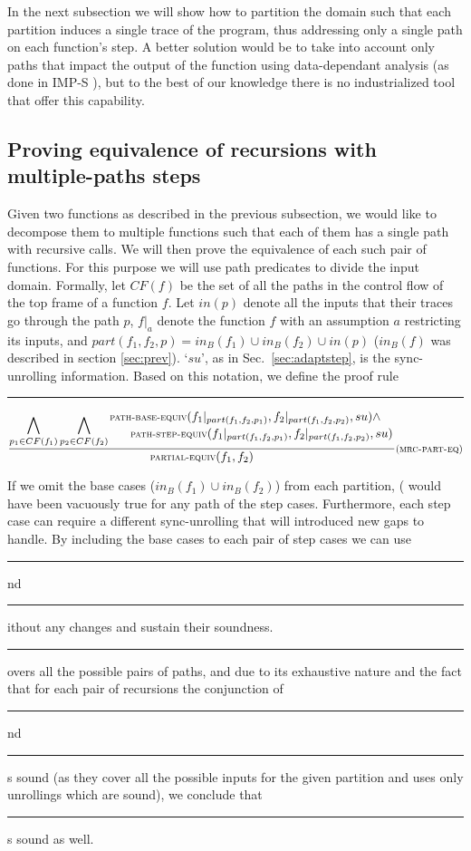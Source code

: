In the next subsection we will show how to partition the domain such that each partition induces a single trace of the program, thus addressing only a single path on each function's step. A better solution would be to take into account only paths that impact the output of the function using data-dependant analysis (as done in IMP-S \cite{inproceedings}), but to the best of our knowledge there is no industrialized tool that offer this capability.

\subsection{Proving equivalence of recursions with multiple-paths steps }
Given two functions as described in the previous subsection, we would like to decompose them to multiple functions such that each of them has a single path with recursive calls. We will then prove the equivalence of each such pair of functions. For this purpose we will use path predicates to divide the input domain. Formally, let $CF(f)$ be the set of all the paths in the control flow of the top frame of a function $f$. Let $in(p)$ denote all the inputs that their traces go through the path $p$, $f|_a$ denote the function $f$ with an assumption $a$ restricting its inputs,  and $part(f_1,f_2,p)=in_B(f_1) \cup in_B(f_2) \cup in(p)$ ($in_B(f)$ was described in section \ref{sec:prev}). `$su$', as in  Sec.~\ref{sec:adaptstep}, is the sync-unrolling information.
Based on this notation, we define the proof rule \rule{MRC-PART-EQ}:

\begin{equation}
{\frac{
  {\displaystyle {\bigwedge_{p_1\in CF(f_1)}\bigwedge_{p_2\in CF(f_2)}}}\splitdfrac{\text{\premise{PATH-BASE-EQUIV}}(f_1|_{part(f_1,f_2,p_1)},f_2|_{part(f_1,f_2,p_2)},su)\wedge}{\text{\premise{PATH-STEP-EQUIV}}(f_1|_{part(f_1,f_2,p_1)},f_2|_{part(f_1,f_2,p_2)},su)}}{\text{\premise{PARTIAL-EQUIV}}(f_1,f_2)}}\text{\rule{MRC-PART-EQ}}
\end{equation}

If we omit the base cases ($in_B(f_1) \cup in_B(f_2)$) from each partition, ( would have been vacuously true for any path of the step cases. Furthermore, each step case can require a different sync-unrolling that will introduced new gaps to handle. By including the base cases to each pair of step cases we can use \rule{PATH-BASE-EQUIV} and  \rule{PATH-STEP-EQUIV} without any changes and sustain their soundness. \rule{MRC-PART-EQ} covers all the possible pairs of paths, and due to its exhaustive nature and the fact that for each pair of recursions the conjunction of \rule{PATH-BASE-EQUIV} and \rule{PATH-STEP-EQUIV} is sound (as they cover all the possible inputs for the given partition and uses only unrollings which are sound), we conclude that \rule{MRC-PART-EQ} is sound as well.

